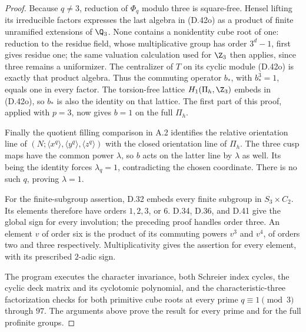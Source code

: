 \begin{proof}
Because $q\ne3$, reduction of $\Phi_q$ modulo
three is square-free.  Hensel lifting its
irreducible factors expresses the last algebra
in (D.42o) as a product of finite unramified
extensions of $\Q_3$.
None contains a nonidentity cube root of one:
reduction to the residue field, whose multiplicative
group has order $3^d-1$, first gives residue one;
the same valuation calculation used for $\Z_3$
then applies, since three remains a uniformizer.
The centralizer of $T$ on its cyclic module
(D.42o) is exactly that product algebra.
Thus the commuting operator $b_*$, with
$b_*^3=1$, equals one in every factor.
The torsion-free lattice
$H_1(\Pi_h,\Z_3)$ embeds in (D.42o), so $b_*$
is also the identity on that lattice.
The first part of this proof, applied with $p=3$,
now gives $b=1$ on the full $\Pi_h$.

Finally the quotient filling comparison in A.2
identifies the relative orientation line of
$(N;\langle x^q\rangle,\langle y^q\rangle,
\langle z^q\rangle)$ with the closed orientation
line of $\Pi_h$.
The three cusp maps have the common power
$\lambda$, so $b$ acts on the latter line by
$\lambda$ as well.
Its being the identity forces
$\lambda_q=1$, contradicting the chosen coordinate.
There is no such $q$, proving $\lambda=1$.

For the finite-subgroup assertion, D.32 embeds
every finite subgroup in $S_3\times C_2$.
Its elements therefore have orders $1,2,3$, or $6$.
D.34, D.36, and D.41 give the global sign for
every involution; the preceding proof handles
order three.  An element $v$ of order six is
the product of its commuting powers $v^3$ and
$v^4$, of orders two and three respectively.
Multiplicativity gives the assertion for every
element, with its prescribed $2$-adic sign.

The program 
executes the character invariance, both Schreier
index cycles, the cyclic deck matrix and its
cyclotomic polynomial, and the characteristic-three
factorization checks for both primitive cube roots
at every prime $q\equiv1\pmod3$ through $97$.
The arguments above prove the result for every
prime and for the full profinite groups.
\end{proof}

